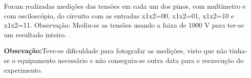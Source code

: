 	Foram realizadas medições das tensões em cada um dos pinos, com multímetro e com osciloscópio,
	do circuito com as entradas x1x2=00, x1x2=01, x1x2=10 e x1x2=11. Observação: Mediu-se as tensões
	usando a faixa de 1000 V para ter-se um resultado inteiro.

	\textbf{Obsevação:}Teve-se dificuldade para fotografar as medições, visto que não tinha-se o equipamento necessário
	e não conseguiu-se outra data para e reexecução do experimento.





